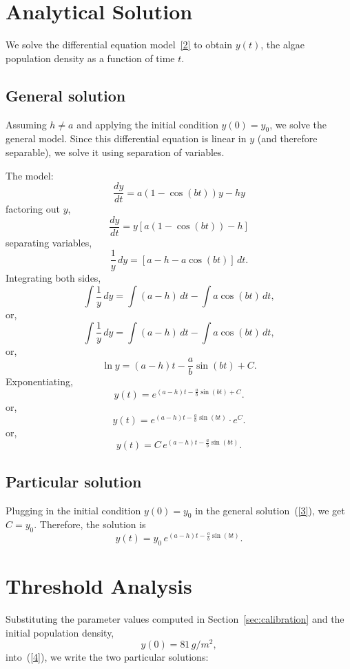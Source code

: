 \documentclass[11pt]{article}
\begin{document}
\section{Analytical Solution}

We solve the differential equation model~\ref{2} to obtain $y(t)$, the algae population density as a function of time $t$.

\subsection{General solution}

Assuming $h \ne a$ and applying the initial condition $y(0)=y_0$, we solve the general model. Since this differential equation is linear in $y$ (and therefore separable), we solve it using separation of variables.

The model:
\[
\frac{dy}{dt} = a(1 - \cos(bt))y - hy
\]
factoring out $y$,
\[
\frac{dy}{dt} = y[a(1 - \cos(bt)) - h]
\]
separating variables,
\[
\frac{1}{y}\, dy = [a - h - a\cos(bt)]\, dt .
\]
Integrating both sides,
\[
\int \frac{1}{y}\, dy = \int (a-h)\,dt - \int a\cos(bt)\,dt,
\]
or,
\[
\int \frac{1}{y}\, dy = \int (a-h)\,dt - \int a\cos(bt)\, dt,
\]
or,
\[
\ln y = (a-h)t - \frac{a}{b}\sin(bt) + C.
\]
Exponentiating,
\[
y(t)=e^{(a-h)t-\frac{a}{b}\sin(bt)+C}.
\]
or,
\[
y(t)=e^{(a-h)t-\frac{a}{b}\sin(bt)} \cdot e^C.
\]
or,
\begin{equation}
    y(t)=C\,e^{(a-h)t-\frac{a}{b}\sin(bt)}.
    \label{3}
    \tag{3}
\end{equation}

\subsection{Particular solution}

Plugging in the initial condition $y(0)=y_0$ in the general solution~(\ref{3}), we get $C=y_0$. Therefore, the solution is
\begin{equation}
    y(t)=y_0\,e^{(a-h)t-\frac{a}{b}\sin(bt)}.
    \label{4}
    \tag{4}
\end{equation}

\section{Threshold Analysis}

Substituting the parameter values computed in Section~\ref{sec:calibration} and the initial population density,
\[
y(0) = 81\, g/m^2,
\]
into~(\ref{4}), we write the two particular solutions:
\end{document}
